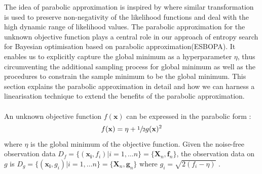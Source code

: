 \documentclass[a4paper,11pt]{report}
\begin{document}
The idea of parabolic approximation is inspired by \cite{gunter2014sampling} where similar transformation is used to preserve non-negativity of the likelihood functions and deal with the high dynamic range of likelihood values.  The parabolic approximation for the unknown objective function plays a central role in our approach of entropy search for Bayesian optimisation based on parabolic approximation(ESBOPA). It enables us to explicitly capture the global minimum as a hyperparameter $\eta$, thus circumventing the additional sampling process for global minimum as well as the procedures to constrain the sample minimum to be the global minimum.  This section explains the parabolic approximation in detail and how we can harness a linearisation technique to extend the benefits of the parabolic approximation. 
\\\\ \noindent
An unknown objective function $f(\mathbf{x}) $ can be expressed in the parabolic form \cite{gunter2014sampling}:
	\begin{equation} 
     f(\mathbf{x}) =\eta+\sfrac{1}{2}g(\mathbf{x})^2 
	\end{equation} 
where $\eta$ is the global minimum of the objective function. Given the noise-free observation data $D_f=\{(\mathbf{x_{i}},f_{i}) \vert i=1, \dots n\}=\{ \mathbf{X}_n,\mathbf{f}_n\}$, the observation data on $g$ is $D_g=\{(\mathbf{x_{i}},g_{i}) \vert i=1, \dots n\}=\{ \mathbf{X}_n,\mathbf{g}_n\}$ where $g_{i}=\sqrt{ 2(f_i-\eta)}$ . 
\\\\ \noindent
\end{document}
